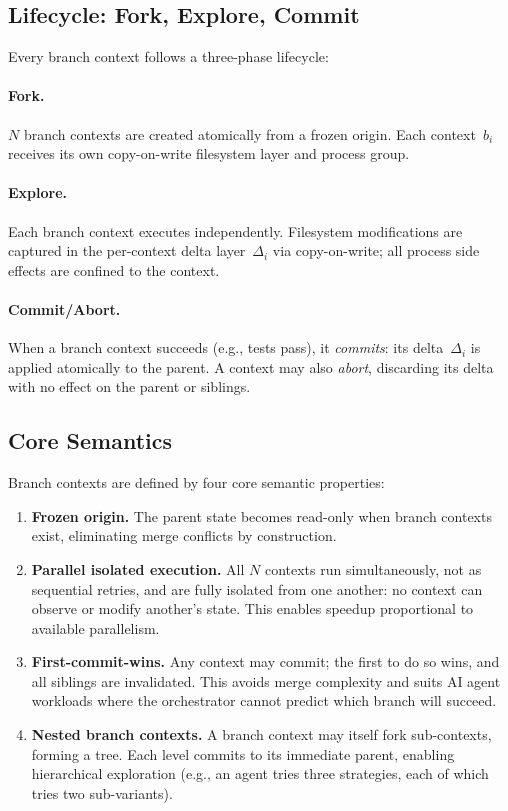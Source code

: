 \documentclass[sigconf]{acmart}
\begin{document}
\subsection{Lifecycle: Fork, Explore, Commit}

Every branch context follows a three-phase lifecycle:

\paragraph{Fork.}
$N$ branch contexts are created atomically from a frozen origin. Each context~$b_i$ receives its own copy-on-write filesystem layer and process group.

\paragraph{Explore.}
Each branch context executes independently. Filesystem modifications are captured in the per-context delta layer~$\Delta_i$ via copy-on-write; all process side effects are confined to the context.

\paragraph{Commit/Abort.}
When a branch context succeeds (e.g., tests pass), it \emph{commits}: its delta~$\Delta_i$ is applied atomically to the parent. A context may also \emph{abort}, discarding its delta with no effect on the parent or siblings.

\subsection{Core Semantics}

Branch contexts are defined by four core semantic properties:

\begin{enumerate}
	\item \textbf{Frozen origin.} The parent state becomes read-only when branch contexts exist, eliminating merge conflicts by construction.

	\item \textbf{Parallel isolated execution.} All $N$ contexts run simultaneously, not as sequential retries, and are fully isolated from one another: no context can observe or modify another's state. This enables speedup proportional to available parallelism.

	\item \textbf{First-commit-wins.} Any context may commit; the first to do so wins, and all siblings are invalidated. This avoids merge complexity and suits AI agent workloads where the orchestrator cannot predict which branch will succeed.

	\item \textbf{Nested branch contexts.} A branch context may itself fork sub-contexts, forming a tree. Each level commits to its immediate parent, enabling hierarchical exploration (e.g., an agent tries three strategies, each of which tries two sub-variants).
\end{enumerate}
\end{document}

